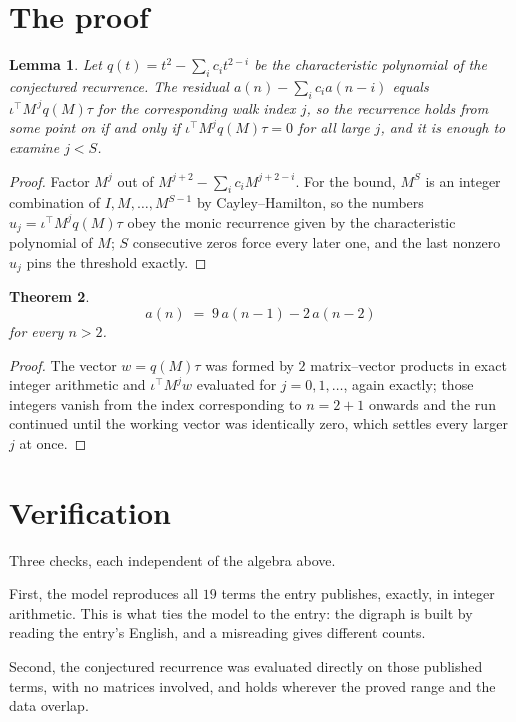 \documentclass[11pt,a4paper]{article}
\theoremstyle{plain}
\newtheorem{theorem}{Theorem}
\newtheorem{lemma}[theorem]{Lemma}
\theoremstyle{definition}
\begin{document}
\section{The proof}

\begin{lemma}\label{lem:crit}
Let $q(t)=t^{2}-\sum_i c_it^{2-i}$ be the characteristic polynomial of the
conjectured recurrence. The residual $a(n)-\sum_ic_ia(n-i)$ equals
$\iota^{\!\top}M^{\,j}q(M)\tau$ for the corresponding walk index $j$, so the recurrence
holds from some point on if and only if $\iota^{\!\top}M^{j}q(M)\tau=0$ for all large $j$,
and it is enough to examine $j<S$.
\end{lemma}

\begin{proof}
Factor $M^{j}$ out of $M^{j+2}-\sum_ic_iM^{j+2-i}$. For the bound, $M^{S}$
is an integer combination of $I,M,\dots,M^{S-1}$ by Cayley--Hamilton, so the numbers
$u_j=\iota^{\!\top}M^{j}q(M)\tau$ obey the monic recurrence given by the characteristic
polynomial of $M$; $S$ consecutive zeros force every later one, and the last nonzero $u_j$
pins the threshold exactly.
\end{proof}

\begin{theorem}
\[
a(n)\;=\;9\,a(n-1) - 2\,a(n-2)
\]
for every $n>2$.
\end{theorem}

\begin{proof}
The vector $w=q(M)\tau$ was formed by $2$ matrix--vector products in exact integer
arithmetic and $\iota^{\!\top}M^{j}w$ evaluated for $j=0,1,\dots$, again exactly; those
integers vanish from the index corresponding to $n=2+1$ onwards and the run continued
until the working vector was identically zero, which settles every larger $j$ at once.
\end{proof}

\section{Verification}

Three checks, each independent of the algebra above.

First, the model reproduces all $19$ terms the entry publishes, exactly, in integer
arithmetic. This is what ties the model to the entry: the digraph is built by reading the
entry's English, and a misreading gives different counts.

Second, the conjectured recurrence was evaluated directly on those published terms, with no
matrices involved, and holds wherever the proved range and the data overlap.
\end{document}
